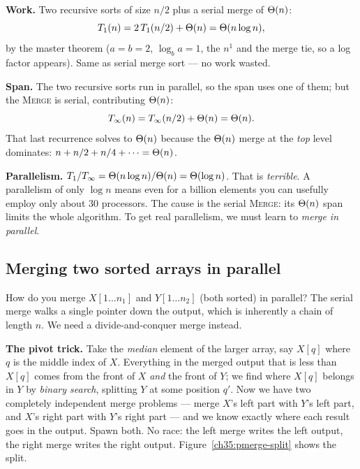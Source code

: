 \textbf{Work.} Two recursive sorts of size $n/2$ plus a serial merge of $\Theta(n)$:
\[
T_1(n) = 2\,T_1(n/2) + \Theta(n) = \Theta(n \log n),
\]
by the master theorem ($a=b=2$, $\log_b a = 1$, the $n^1$ and the merge tie, so a
log factor appears). Same as serial merge sort --- no work wasted.

\textbf{Span.} The two recursive sorts run in parallel, so the span uses one of
them; but the \textsc{Merge} is serial, contributing $\Theta(n)$:
\[
T_\infty(n) = T_\infty(n/2) + \Theta(n) = \Theta(n).
\]
That last recurrence solves to $\Theta(n)$ because the $\Theta(n)$ merge at the
\emph{top} level dominates: $n + n/2 + n/4 + \cdots = \Theta(n)$.

\textbf{Parallelism.} $T_1/T_\infty = \Theta(n\log n)/\Theta(n) = \Theta(\log n)$. That is
\emph{terrible}. A parallelism of only $\log n$ means even for a billion elements
you can usefully employ only about $30$ processors. The cause is the
serial \textsc{Merge}: its $\Theta(n)$ span limits the whole algorithm. To
get real parallelism, we must learn to \emph{merge in parallel}.

\subsection{Merging two sorted arrays in parallel}

How do you merge $X[1 \ldots n_1]$ and $Y[1 \ldots n_2]$ (both sorted) in
parallel? The serial merge walks a single pointer down the output, which is
inherently a chain of length $n$. We need a divide-and-conquer merge instead.

\begin{intuitionbox}
\textbf{The pivot trick.} Take the \emph{median} element of the larger array, say
$X[q]$ where $q$ is the middle index of $X$. Everything in the merged output that
is less than $X[q]$ comes from the front of $X$ \emph{and} the front of $Y$; we
find where $X[q]$ belongs in $Y$ by \emph{binary search}, splitting $Y$ at some
position $q'$. Now we have two completely independent merge problems --- merge
$X$'s left part with $Y$'s left part, and $X$'s right part with $Y$'s right part
--- and we know exactly where each result goes in the output. Spawn both. No race:
the left merge writes the left output, the right merge writes the right output.
Figure~\ref{ch35:pmerge-split} shows the split.
\end{intuitionbox}

